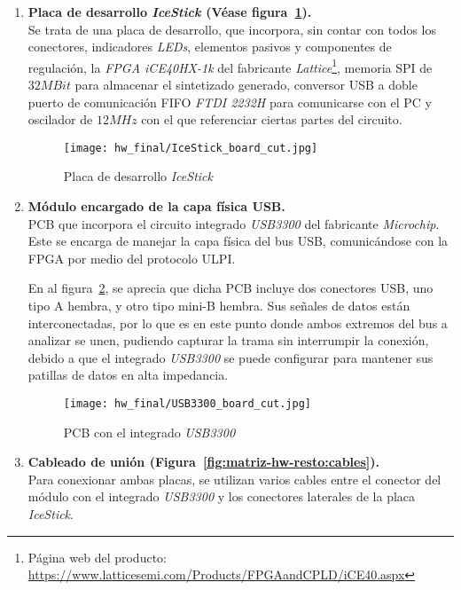 \begin{enumerate}
    \item \textbf{Placa de desarrollo \emph{IceStick \cite{icestickmanual}} (Véase figura~\ref{fig:IceStick_board}).} \\
    Se trata de una placa de desarrollo, que incorpora, sin contar con todos los conectores, indicadores \emph{LEDs}, elementos pasivos y componentes de regulación, la \emph{FPGA iCE40HX-1k\cite{lattice:ice40}} del fabricante \emph{Lattice}\footnote{Página web del producto: \url{https://www.latticesemi.com/Products/FPGAandCPLD/iCE40.aspx}}, memoria SPI de $32MBit$ para almacenar el sintetizado generado, conversor USB a doble puerto de comunicación FIFO \emph{FTDI 2232H\cite{FTDI:FT2232HL}} para comunicarse con el PC y oscilador de $12MHz$ con el que referenciar ciertas partes del circuito.
    
    \begin{figure}[htbp]
        \centering
        \texttt{[image: hw\_final/IceStick\_board\_cut.jpg]}
        \caption{Placa de desarrollo \emph{IceStick}}
        \label{fig:IceStick_board}
    \end{figure}

    \item \textbf{Módulo encargado de la capa física USB.} \\
    PCB que incorpora el circuito integrado \emph{USB3300\cite{icestickmanual}} del fabricante \emph{Microchip}. Este se encarga de manejar la capa física del bus USB, comunicándose con la FPGA por medio del protocolo ULPI\cite{ulpi-specs}.

    En al figura~\ref{fig:USB3300_board}, se aprecia que dicha PCB incluye dos conectores USB, uno tipo A hembra, y otro tipo mini-B hembra. Sus señales de datos están interconectadas, por lo que es en este punto donde ambos extremos del bus a analizar se unen, pudiendo capturar la trama sin interrumpir la conexión, debido a que el integrado \emph{USB3300} se puede configurar para mantener sus patillas de datos en alta impedancia.

    \begin{figure}[htbp]
        \centering
        \texttt{[image: hw\_final/USB3300\_board\_cut.jpg]}
        \caption{PCB con el integrado \emph{USB3300}}
        \label{fig:USB3300_board}
    \end{figure}

    \item \textbf{Cableado de unión (Figura~\ref{fig:matriz-hw-resto:cables}).} \\
    Para conexionar ambas placas, se utilizan varios cables entre el conector del módulo con el integrado \emph{USB3300} y los conectores laterales de la placa \emph{IceStick}.


\end{enumerate}

